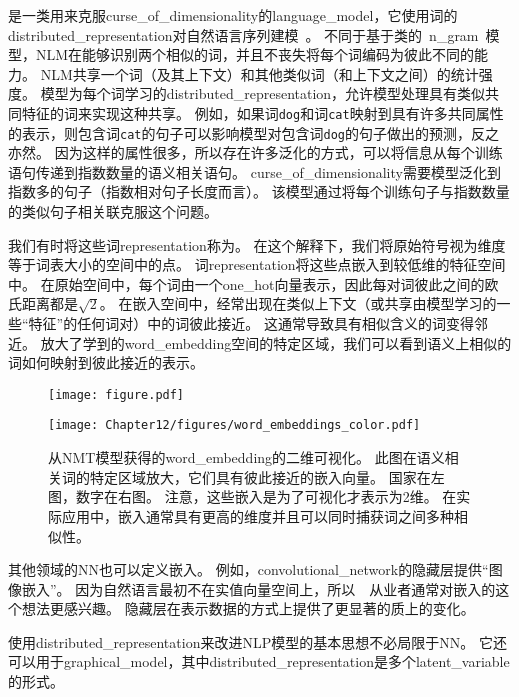 是一类用来克服\gls{curse_of_dimensionality}的\gls{language_model}，它使用词的\gls{distributed_representation}对自然语言序列建模~\citep{BenDucVin01-small}。
不同于基于类的~\gls{n_gram}~模型，\gls{NLM}在能够识别两个相似的词，并且不丧失将每个词编码为彼此不同的能力。
\gls{NLM}共享一个词（及其上下文）和其他类似词（和上下文之间）的统计强度。
模型为每个词学习的\gls{distributed_representation}，允许模型处理具有类似共同特征的词来实现这种共享。
例如，如果词{\tt dog}和词{\tt cat}映射到具有许多共同属性的表示，则包含词{\tt cat}的句子可以影响模型对包含词{\tt dog}的句子做出的预测，反之亦然。
因为这样的属性很多，所以存在许多泛化的方式，可以将信息从每个训练语句传递到指数数量的语义相关语句。
\gls{curse_of_dimensionality}需要模型泛化到指数多的句子（指数相对句子长度而言）。
该模型通过将每个训练句子与指数数量的类似句子相关联克服这个问题。


我们有时将这些词\gls{representation}称为。
在这个解释下，我们将原始符号视为维度等于词表大小的空间中的点。
词\gls{representation}将这些点嵌入到较低维的特征空间中。
在原始空间中，每个词由一个\gls{one_hot}向量表示，因此每对词彼此之间的欧氏距离都是$\sqrt{2}$。
在嵌入空间中，经常出现在类似上下文（或共享由模型学习的一些``特征''的任何词对）中的词彼此接近。
这通常导致具有相似含义的词变得邻近。
放大了学到的\gls{word_embedding}空间的特定区域，我们可以看到语义上相似的词如何映射到彼此接近的表示。

\begin{figure}[htp]
\centering
\ifOpenSource
\centerline{\texttt{[image: figure.pdf]}}
\else
\texttt{[image: Chapter12/figures/word\_embeddings\_color.pdf]}
\fi
\caption{从\gls{NMT}模型获得的\gls{word_embedding}的二维可视化\citep{Bahdanau-et-al-ICLR2015-small}。
此图在语义相关词的特定区域放大，它们具有彼此接近的嵌入向量。
国家在左图，数字在右图。
注意，这些嵌入是为了可视化才表示为2维。
在实际应用中，嵌入通常具有更高的维度并且可以同时捕获词之间多种相似性。
}
\label{fig:chap12_word_embeddings_color}
\end{figure}

其他领域的\gls{NN}也可以定义嵌入。
例如，\gls{convolutional_network}的隐藏层提供``图像嵌入''。
因为自然语言最初不在实值向量空间上，所以~~从业者通常对嵌入的这个想法更感兴趣。
隐藏层在表示数据的方式上提供了更显著的质上的变化。


使用\gls{distributed_representation}来改进\gls{NLP}模型的基本思想不必局限于\gls{NN}。
它还可以用于\gls{graphical_model}，其中\gls{distributed_representation}是多个\gls{latent_variable}的形式\citep{Mnih+Hinton-2007}。

